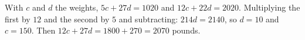 With $c$ and $d$ the weights, $5c+27d=1020$ and $12c+22d=2020$. Multiplying the first by $12$ and the second by $5$ and subtracting: $214d=2140$, so $d=10$ and $c=150$. Then $12c+27d=1800+270=\boxed{2070}$ pounds.
